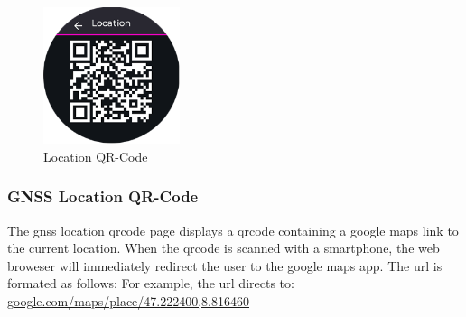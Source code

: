 \begin{minipage}{\linewidth}
	\begin{figure}
		\vspace{-0.6cm}
		\includegraphics[width=4cm]{images/6_design_final/gui/07_gnss_location.png}
		\centering
		\caption{Location QR-Code}
		\label{fig:final_design_gui_gnss_location}
	\end{figure}
	\subsubsection{GNSS Location QR-Code}
	The \acrshort{gnss} location \acrshort{qrcode} page displays a \acrshort{qrcode} containing a google maps link to the current location.
	When the \acrshort{qrcode} is scanned with a smartphone, the web broweser will immediately redirect the user to the google maps app.
	The \acrshort{url} is formated as follows: \smallskip \newline
	 \smallskip \newline
	For example, the \acrshort{url} directs to: \smallskip \newline
	\url{google.com/maps/place/47.222400,8.816460}
\end{minipage}
\vspace{-0.2cm}

